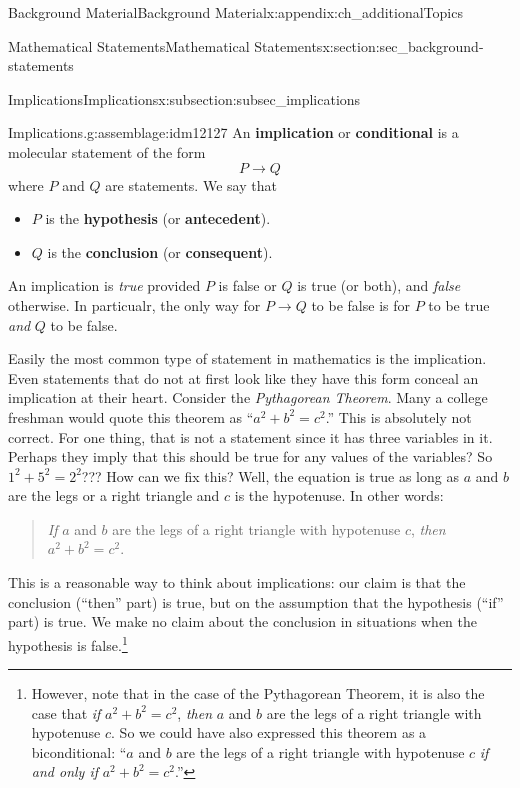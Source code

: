 \documentclass[oneside,10pt,]{book}
\newcommand{\terminology}[1]{\textbf{#1}}
\numberwithin{equation}{chapter}
\def\imp{\rightarrow}
\begin{document}
\begin{appendixptx}{Background Material}{}{Background Material}{}{}{x:appendix:ch_additionalTopics}
\begin{sectionptx}{Mathematical Statements}{}{Mathematical Statements}{}{}{x:section:sec_background-statements}
%
%
\typeout{************************************************}
\typeout{************************************************}
%
\begin{subsectionptx}{Implications}{}{Implications}{}{}{x:subsection:subsec_implications}
\begin{assemblage}{Implications.}{g:assemblage:idm12127}%
An \terminology{implication} or \terminology{conditional} is a molecular statement of the form%
\begin{equation*}
P \imp Q
\end{equation*}
where \(P\) and \(Q\) are statements.  We say that%
\begin{itemize}[label=\textbullet]
\item{}\(P\) is the \terminology{hypothesis} (or \terminology{antecedent}).%
\item{}\(Q\) is the \terminology{conclusion} (or \terminology{consequent}).%
\end{itemize}
%
\par
An implication is \emph{true} provided \(P\) is false or  \(Q\) is true (or both), and \emph{false} otherwise.  In particualr, the only way for \(P \imp Q\) to be false is for \(P\) to be true \emph{and} \(Q\) to be false.%
\end{assemblage}
Easily the most common type of statement in mathematics is the implication. Even statements that do not at first look like they have this form conceal an implication at their heart. Consider the \emph{Pythagorean Theorem}. Many a college freshman would quote this theorem as ``\(a^2 + b^2 = c^2\).'' This is absolutely not correct. For one thing, that is not a statement since it has three variables in it. Perhaps they imply that this should be true for any values of the variables?  So \(1^2 + 5^2 = 2^2\)??? How can we fix this? Well, the equation is true as long as \(a\) and \(b\) are the legs or a right triangle and \(c\) is the hypotenuse. In other words:%
\begin{quote}%
\emph{If} \(a\) and \(b\) are the legs of a right triangle with hypotenuse \(c\), \emph{then} \(a^2 + b^2 = c^2\).%
\end{quote}
This is a reasonable way to think about implications: our claim is that the conclusion (``then'' part) is true, but on the assumption that the hypothesis (``if'' part) is true. We make no claim about the conclusion in situations when the hypothesis is false.\footnote{However, note that in the case of the Pythagorean Theorem, it is also the case that \emph{if} \(a^2 + b^2 = c^2\), \emph{then} \(a\) and \(b\) are the legs of a right triangle with hypotenuse \(c\).  So we could have also expressed this theorem as a biconditional: ``\(a\) and \(b\) are the legs of a right triangle with hypotenuse \(c\) \emph{if and only if} \(a^2 + b^2 = c^2\).''\label{g:fn:idm12176}}%

\end{subsectionptx}
\end{sectionptx}
\end{appendixptx}
\end{document}
